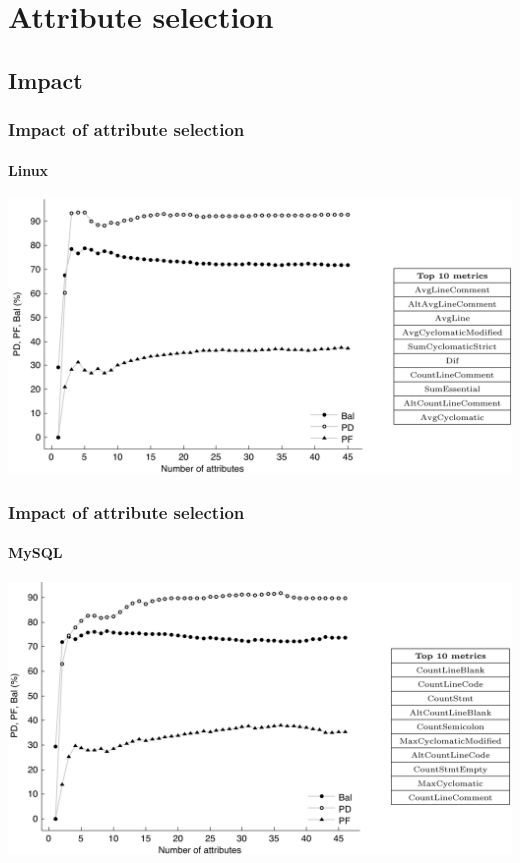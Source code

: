 \section{Attribute selection}
\subsection{Impact}
\begin{frame}
 \frametitle{Impact of attribute selection}
 \framesubtitle{Linux}
 \begin{center}
  \includegraphics[width=\textwidth]{figures/attributesLinux.png}
 \end{center}
\end{frame}

\begin{frame}
 \frametitle{Impact of attribute selection}
 \framesubtitle{MySQL}
 \begin{center}
  \includegraphics[width=\textwidth]{figures/attributesMysql.png}
 \end{center}
\end{frame}

